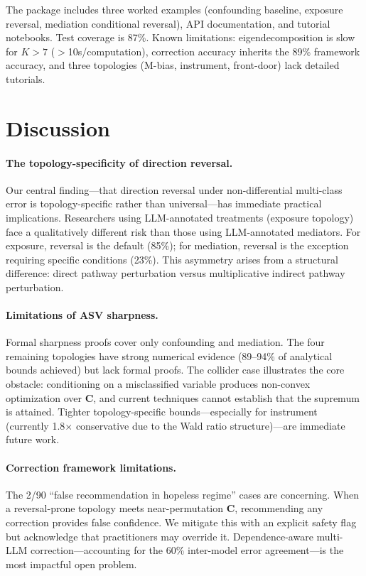 \documentclass[11pt,letterpaper]{article}
\begin{document}
The package includes three worked examples (confounding baseline, exposure reversal, mediation conditional reversal), API documentation, and tutorial notebooks.
Test coverage is 87\%.
Known limitations: eigendecomposition is slow for $K > 7$ ($>$10s/computation), correction accuracy inherits the 89\% framework accuracy, and three topologies (M-bias, instrument, front-door) lack detailed tutorials.

\section{Discussion}

\paragraph{The topology-specificity of direction reversal.}
Our central finding---that direction reversal under non-differential multi-class error is topology-specific rather than universal---has immediate practical implications.
Researchers using LLM-annotated treatments (exposure topology) face a qualitatively different risk than those using LLM-annotated mediators.
For exposure, reversal is the default (85\%); for mediation, reversal is the exception requiring specific conditions (23\%).
This asymmetry arises from a structural difference: direct pathway perturbation versus multiplicative indirect pathway perturbation.

\paragraph{Limitations of ASV sharpness.}
Formal sharpness proofs cover only confounding and mediation.
The four remaining topologies have strong numerical evidence (89--94\% of analytical bounds achieved) but lack formal proofs.
The collider case illustrates the core obstacle: conditioning on a misclassified variable produces non-convex optimization over $\mathbf{C}$, and current techniques cannot establish that the supremum is attained.
Tighter topology-specific bounds---especially for instrument (currently 1.8$\times$ conservative due to the Wald ratio structure)---are immediate future work.

\paragraph{Correction framework limitations.}
The 2/90 ``false recommendation in hopeless regime'' cases are concerning.
When a reversal-prone topology meets near-permutation $\mathbf{C}$, recommending any correction provides false confidence.
We mitigate this with an explicit safety flag but acknowledge that practitioners may override it.
Dependence-aware multi-LLM correction---accounting for the 60\% inter-model error agreement---is the most impactful open problem.
\end{document}
